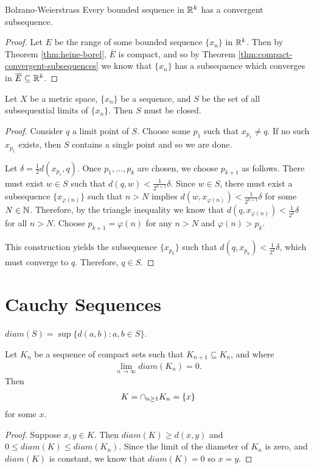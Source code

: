 \begin{thm}{Bolzano-Weierstrass}\proofbreak
    Every bounded sequence in $\mathbb{R}^{k}$ has a convergent subsequence.
\end{thm}

\begin{proof}
    Let $E$ be the range of some bounded sequence $\{x_n\}$ in $\mathbb{R}^k$. Then by Theorem \ref{thm:heine-borel}, $\overline{E}$ is compact, and so by Theorem \ref{thm:compact-convergent-subsequences} we know that $\{x_n\}$ has a subsequence which converges in $\overline{E} \subseteq \mathbb{R}^k$.
\end{proof}

\begin{thm}
    Let $X$ be a metric space, $\{x_n\}$ be a sequence, and $S$ be the set of all subsequential limits of $\{x_n\}$. Then $S$ must be closed.
\end{thm}

\begin{proof}
    Consider $q$ a limit point of $S$. Choose some $p_1$ such that $x_{p_1} \neq q$. If no such $x_{p_1}$ exists, then $S$ contains a single point and so we are done.

    Let $\delta = \frac{1}{2}d(x_{p_1}, q)$. Once $p_1, \ldots, p_k$ are chosen, we choose $p_{k+1}$ as follows. There must exist $w \in S$ such that $d(q, w) < \frac{1}{2^{k+1}}\delta$. Since $w \in S$, there must exist a subsequence $\{x_{\varphi(n)}\}$ such that $n > N$ implies $d(w, x_{\varphi(n)}) < \frac{1}{2^{k+1}}\delta$ for some $N \in \mathbb{N}$. Therefore, by the triangle inequality we know that $d(q, x_{\varphi(n)}) < \frac{1}{2^{k}}\delta$ for all $n > N$. Choose $p_{k+1} = \varphi(n)$ for any $n > N$ and $\varphi(n) > p_k$.

    This construction yields the subsequence $\{x_{p_k}\}$ such that $d(q, x_{p_k}) < \frac{1}{2^{k}}\delta$, which must converge to $q$. Therefore, $q \in S$.
\end{proof}

\section{Cauchy Sequences}

\begin{defn}
    $diam(S) = \sup \{d(a, b) : a, b \in S\}$.
\end{defn}

\begin{thm}
    Let $K_n$ be a sequence of compact sets such that $K_{n+1} \subseteq K_n$, and where
    \begin{align*}
        \lim_{n\to\infty}diam(K_n) = 0.
    \end{align*}
    Then
    \begin{align*}
        K = \cap_{n\geq 1}K_n = \{x\}
    \end{align*}
    for some $x$.
\end{thm}

\begin{proof}
    Suppose $x, y \in K$. Then $diam(K) \geq d(x, y)$ and $0 \leq diam(K) \leq diam(K_n)$. Since the limit of the diameter of $K_n$ is zero, and $diam(K)$ is constant, we know that $diam(K) = 0$ so $x = y$.
\end{proof}
